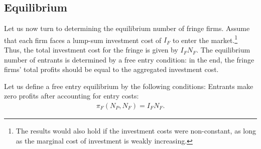 \subsection{Equilibrium}
\label{sec:more_general_equilibrium}

Let us now turn to determining the equilibrium number of fringe firms.
Assume that each firm faces a lump-sum investment cost of $I_F$ to enter the market.\footnote{
    The results would also hold if the investment costs were non-constant, as long as the marginal cost of investment is weakly increasing.
}
Thus, the total investment cost for the fringe is given by $I_F N_F$.
The equilibrium number of entrants is determined by a free entry condition: in the end, the fringe firms' total profits should be equal to the aggregated investment cost.
\begin{assumption}
    \label{ass:free_entry}
    Let us define a free entry equilibrium by the following conditions: Entrants make zero profits after accounting for entry costs: 
    \begin{align*}
        \pi_F(N_P, N_F) = I_F N_F.
    \end{align*}
\end{assumption}

